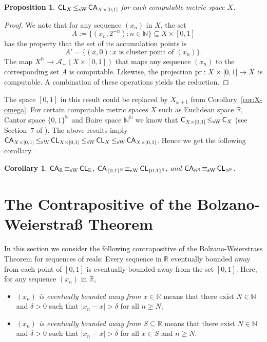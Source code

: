 \documentclass[a4paper]{amsart}
\def\AA{{\mathcal A}}
\def\IN{{\mathbb{N}}}
\def\IR{{\mathbb{R}}}
\def\In{\subseteq}
\def\pr{{\rm pr}}
\def\Cantor{{\{0,1\}^\IN}}
\def\Baire{{\IN^\IN}}
\def\C{\mbox{\rm\sffamily C}}
\def\CA{\text{\rm\sffamily C$_{\rm\mathsf A}$}}
\def\CL{\text{\rm\sffamily CL}}
\def\CA{\text{\rm\sffamily CA}}
\def\leqSW{\mathop{\leq_{\mathrm{sW}}}}
\def\equivSW{\mathop{\equiv_{\mathrm{sW}}}}
\newcommand{\bbN}{\mathbb{N}}
\newcommand{\bbR}{\mathbb{R}}
\newcommand{\omu}{{\omega+1}}
\newcommand{\de}{\delta}
\newtheorem{proposition}[theorem]{Proposition}
\newtheorem{corollary}[theorem]{Corollary}
\theoremstyle{definition}
\begin{document}
\begin{proposition}
$\CL_X\leqSW\CA_{X\times[0,1]}$ for each computable metric space $X$.
\end{proposition}
\begin{proof}
We note that for any sequence $(x_n)$ in $X$, the set
\[A:=\{(x_n,2^{-n}):n\in\IN\}\In X\times[0,1]\]
has the property that the set of its accumulation points is
\[A'=\{(x,0):\mbox{$x$ is cluster point of $(x_n)$}\}.\]
The map $X^\IN\to\AA_+(X\times[0,1])$ that maps any sequence
$(x_n)$ to the corresponding set $A$ is computable.
Likewise, the projection $\pr:X\times[0,1]\to X$ is computable.
A combination of these operations yields the reduction.
\end{proof}

The space $[0,1]$ in this result could be replaced by $X_\omu$ 
from Corollary~\ref{cor:X-omega}. For certain computable metric spaces $X$
such as Euclidean space $\IR$, Cantor space $\Cantor$ and Baire space $\Baire$
we know that $\C_{X\times[0,1]}\leqSW\C_{X}$ (see Section~7 of \cite{BBP}).
The above results imply $\CA_{X\times[0,1]}\leqSW\CL_{X\times[0,1]}\leqSW\CL_X\leqSW\CA_{X\times[0,1]}$.
Hence we get the following corollary.

\begin{corollary}
$\CA_\IR\equivSW\CL_\IR$, $\CA_\Cantor\equivSW\CL_\Cantor$, and $\CA_\Baire\equivSW\CL_\Baire$.
\end{corollary}


\section{The Contrapositive of the Bolzano-Weierstra\ss{} Theorem}

In this section we consider the following contrapositive of the
Bolzano-Weierstrass Theorem for sequences of reals:
Every sequence in $\bbR$ eventually bounded away from each point of
$[0,1]$ is eventually bounded away from the set $[0,1]$.
Here, for any sequence $(x_n)$ in $\bbR$,
\begin{itemize}
    \item \emph{$(x_n)$ is eventually bounded away from $x \in
        \bbR$} means that there exist $N \in \bbN$ and $\de>0$
        such that $|x_n-x|>\de$ for all $n \geq N$;
    \item \emph{$(x_n)$ is eventually bounded away from $S
        \subseteq \bbR$} means that there exist $N \in \bbN$ and
        $\de>0$ such that $|x_n-x|>\de$ for all $x \in S$ and
        $n\geq N$.
\end{itemize}
\end{document}
